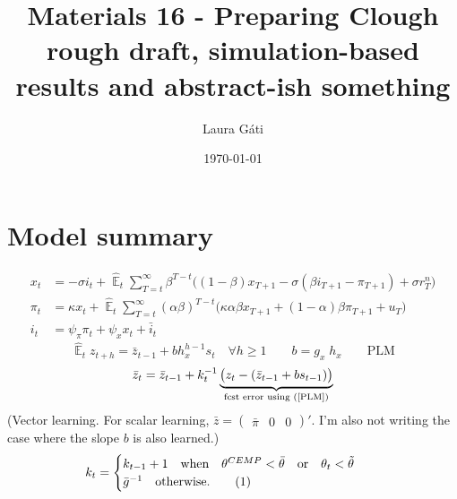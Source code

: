\documentclass[11pt]{article}
\renewcommand{\[}{\begin{equation}}
\renewcommand{\]}{\end{equation}}
\DeclareMathOperator{\E}{\mathbb{E}}
\newcommand\numberthis{\addtocounter{equation}{1}\tag{\theequation}} %
\begin{document}
\linespread{1.0}

\title{Materials 16 - Preparing Clough rough draft, simulation-based results and abstract-ish something}
\author{Laura G\'ati} 
\date{\today}
\maketitle


\tableofcontents


\newpage
\section{Model summary}
\begin{align}
x_t &=  -\sigma i_t +\hat{\E}_t \sum_{T=t}^{\infty} \beta^{T-t }\big( (1-\beta)x_{T+1} - \sigma(\beta i_{T+1} - \pi_{T+1}) +\sigma r_T^n \big)  \label{prestons18}  \\
\pi_t &= \kappa x_t +\hat{\E}_t \sum_{T=t}^{\infty} (\alpha\beta)^{T-t }\big( \kappa \alpha \beta x_{T+1} + (1-\alpha)\beta \pi_{T+1} + u_T\big) \label{prestons19}  \\
i_t &= \psi_{\pi}\pi_t + \psi_{x} x_t  + \bar{i}_t \label{TR}
\end{align}
\begin{equation}
\hat{\E}_t z_{t+h} =  \bar{z}_{t-1} + bh_x^{h-1}s_t  \quad \forall h\geq 1 \quad \quad b = g_x\; h_x \quad \quad \text{PLM} \label{PLM}
\end{equation}
\begin{equation}
\bar{z}_{t} = \bar{z}_{t-1} +k_t^{-1}\underbrace{\big(z_{t} -(\bar{z}_{t-1}+bs_{t-1}) \big)}_{\text{fcst error using (\ref{PLM})} } 
\end{equation}
(Vector learning. For scalar learning, $\bar{z}= \begin{pmatrix} \bar{\pi} & 0 & 0\end{pmatrix}' $. I'm also not writing the case where the slope $b$ is also learned.)
 \begin{align*}
k_t & = \begin{cases} k_{t-1}+1 \quad \text{when} \quad \theta^{CEMP} < \bar{\theta} \quad \text{or}  \quad  \theta_t < \tilde{\theta}  \\ \bar{g}^{-1}  \quad \text{otherwise.}\numberthis
\end{cases} 
\end{align*}
\end{document}
